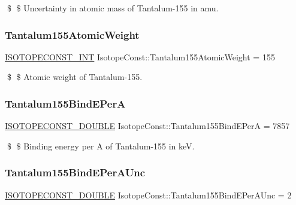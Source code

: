 \$ \$ Uncertainty in atomic mass of Tantalum-\/155 in amu. \mbox{\label{group___isotope_const-_tantalum-_ta155_ga90a3eac7c5fb4082ee06972dfd617269}} 
\subsubsection{\texorpdfstring{Tantalum155\+Atomic\+Weight}{Tantalum155AtomicWeight}}
{\footnotesize\ttfamily \mbox{\hyperlink{group___isotope_const-_macros_ga5f18360b3e99483a35c32d789e62621c}{I\+S\+O\+T\+O\+P\+E\+C\+O\+N\+S\+T\+\_\+\+I\+NT}} Isotope\+Const\+::\+Tantalum155\+Atomic\+Weight = 155}

\$ \$ Atomic weight of Tantalum-\/155. \mbox{\label{group___isotope_const-_tantalum-_ta155_gabbe32d1e69616f1a03d287d45e08dd2b}} 
\subsubsection{\texorpdfstring{Tantalum155\+Bind\+E\+PerA}{Tantalum155BindEPerA}}
{\footnotesize\ttfamily \mbox{\hyperlink{group___isotope_const-_macros_ga8f45a7272ce02c0b4c65c44636ed719a}{I\+S\+O\+T\+O\+P\+E\+C\+O\+N\+S\+T\+\_\+\+D\+O\+U\+B\+LE}} Isotope\+Const\+::\+Tantalum155\+Bind\+E\+PerA = 7857}

\$ \$ Binding energy per A of Tantalum-\/155 in keV. \mbox{\label{group___isotope_const-_tantalum-_ta155_gac29f3bd9ca616c0f1bffad9f441a14d0}} 
\subsubsection{\texorpdfstring{Tantalum155\+Bind\+E\+Per\+A\+Unc}{Tantalum155BindEPerAUnc}}
{\footnotesize\ttfamily \mbox{\hyperlink{group___isotope_const-_macros_ga8f45a7272ce02c0b4c65c44636ed719a}{I\+S\+O\+T\+O\+P\+E\+C\+O\+N\+S\+T\+\_\+\+D\+O\+U\+B\+LE}} Isotope\+Const\+::\+Tantalum155\+Bind\+E\+Per\+A\+Unc = 2}

